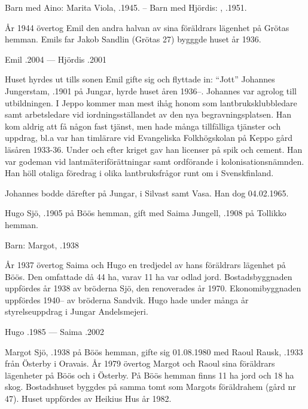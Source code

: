 Barn med Aino: Marita Viola, .1945. -- Barn med Hjördis: , .1951.

År 1944 övertog Emil den andra halvan av sina föräldrars lägenhet på Grötas hemman. Emils far Jakob Sandlin (Grötas 27) bygggde huset 			 år 1936.

Emil .2004  ---  Hjördis .2001


Huset hyrdes ut tills sonen Emil gifte sig och flyttade in: ``Jott'' Johannes Jungerstam, .1901 på Jungar, hyrde huset åren 1936--. Johannes var agrolog till utbildningen. I Jeppo kommer man mest ihåg honom som lantbruksklubbledare samt arbetsledare vid iordningsställandet av den nya begravningsplatsen. Han kom aldrig att få någon fast tjänst, men hade många tillfälliga tjänster och uppdrag, bl.a var han timlärare vid Evangeliska Folkhögskolan på Keppo gård läsåren 1933-36. Under och efter kriget gav han licenser på spik och cement. Han var godeman vid lantmäteriförättningar samt ordförande i kolonisationsnämnden. Han höll otaliga föredrag i olika lantbruksfrågor runt om i Svenskfinland.

Johannes bodde därefter på Jungar, i Silvast samt Vasa. Han dog 04.02.1965.



%



%
Hugo Sjö, .1905 på Böös hemman, gift med Saima Jungell, .1908 på Tollikko hemman.

Barn: Margot, .1938

År 1937 övertog Saima och Hugo en tredjedel av hans föräldrars lägenhet på Böös. Den omfattade då 44 ha, varav 11 ha var odlad jord. Bostadsbyggnaden uppfördes år 1938 av bröderna Sjö, den renoverades år 1970. Ekonomibyggnaden uppfördes 1940-- av bröderna Sandvik. Hugo hade under många år styrelseuppdrag i Jungar Andelsmejeri.

Hugo .1985  ---  Saima .2002



%
Margot Sjö, .1938 på Böös hemman, gifte sig 01.08.1980 med Raoul Rausk, .1933 från Österby i Oravais. År 1979 övertog Margot och Raoul sina föräldrars lägenheter på Böös och i Österby. På Böös hemman finns 11 ha jord och 18 ha skog. Bostadshuset byggdes på samma tomt som Margots föräldrahem (gård nr 47). Huset uppfördes av Heikius Hus år 1982.\jhvspace{}




